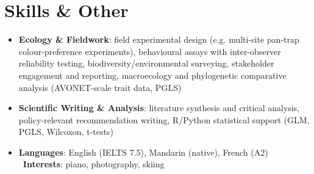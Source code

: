 \documentclass{my-resume}
\begin{document}
\section{Skills \& Other}
\entrySkillsSep
\begin{itemize}[parsep=0.2ex]
  \item \textbf{Ecology \& Fieldwork}: field experimental design (e.g. multi-site pan-trap colour-preference experiments), behavioural assays with inter-observer reliability testing, biodiversity/environmental surveying, stakeholder engagement and reporting, macroecology and phylogenetic comparative analysis (AVONET-scale trait data, PGLS)
  \item \textbf{Scientific Writing \& Analysis}: literature synthesis and critical analysis, policy-relevant recommendation writing, R/Python statistical support (GLM, PGLS, Wilcoxon, t-tests)
  \item \textbf{Languages}: English (IELTS 7.5), Mandarin (native), French (A2) \textbar\ \textbf{Interests}: piano, photography, skiing
\end{itemize}
\end{document}
